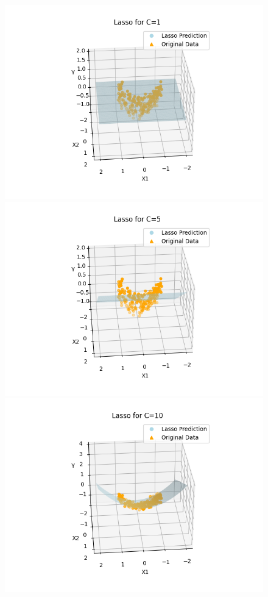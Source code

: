 \documentclass[10pt]{article}
\begin{document}
\begin{figure}[H]
  \begin{center}
    \includegraphics[scale=0.4]{./images/Figure_2_1.png}
    \includegraphics[scale=0.4]{./images/Figure_2_5.png}
    \includegraphics[scale=0.4]{./images/Figure_2_10.png}

\end{center}
\end{figure}
\end{document}

